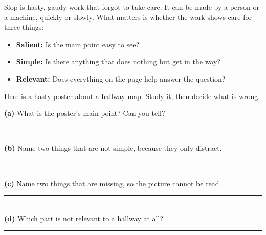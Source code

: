 \clearpage
\thispagestyle{fancy}\label{slop}
Slop is hasty, gaudy work that forgot to take care. It can be made by a person or a machine, quickly or slowly. What matters is whether the work shows care for three things:
\begin{itemize}[leftmargin=1.6em]
\item \textbf{Salient:} Is the main point easy to see?
\item \textbf{Simple:} Is there anything that does nothing but get in the way?
\item \textbf{Relevant:} Does everything on the page help answer the question?
\end{itemize}

Here is a hasty poster about a hallway map. Study it, then decide what is wrong.

\begin{center}
\end{center}

\begin{slopbox}
\textbf{(a)} What is the poster's main point? Can you tell?\\[3pt]\rule{\linewidth}{0.5pt}\\[6pt]
\textbf{(b)} Name two things that are not simple, because they only distract.\\[3pt]\rule{\linewidth}{0.5pt}\\[6pt]
\textbf{(c)} Name two things that are missing, so the picture cannot be read.\\[3pt]\rule{\linewidth}{0.5pt}\\[6pt]
\textbf{(d)} Which part is not relevant to a hallway at all?\\[3pt]\rule{\linewidth}{0.5pt}
\end{slopbox}

